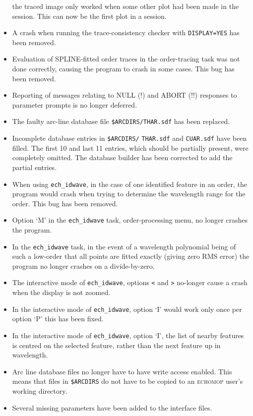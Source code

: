\documentclass[twoside,11pt,nolof]{starlink}
\begin{document}
\begin{itemize}
   the traced image only worked when some other plot had been made in
   the session.  This can now be the first plot in a session.
\item A crash when running the trace-consistency checker with
   {\tt DISPLAY=YES} has been removed.
\item Evaluation of SPLINE-fitted order traces in the order-tracing task
   was not done correctly, causing the program to crash in some cases.
   This bug has been removed.
\item Reporting of messages relating to NULL (!) and ABORT (!!) responses
   to parameter prompts is no longer deferred.
\item The faulty arc-line database file \texttt{\$ARCDIRS/THAR.sdf}
   has been replaced.
\item Incomplete database entries in \texttt{\$ARCDIRS/} \texttt{THAR.sdf} and
   \texttt{CUAR.sdf}
   have been filled.  The first 10 and last 11 entries, which should be
   partially present, were completely omitted.  The database builder has
   been corrected to add the partial entries.
\item When using {\tt ech\_idwave}, in the case of one identified feature in an
   order, the program would crash when trying to determine the wavelength
   range for the order.  This bug has been removed.
\item Option `M' in the {\tt ech\_idwave} task, order-processing menu,
   no longer crashes the program.
\item In the {\tt ech\_idwave} task, in the event of a wavelength polynomial
   being
   of such a low-order that all points are fitted exactly (giving zero
   RMS error) the program no longer crashes on a divide-by-zero.
\item The interactive mode of {\tt ech\_idwave}, options \texttt{<} and \texttt{>}
   no-longer cause a crash when the display is not zoomed.
\item In the interactive mode of {\tt ech\_idwave}, option `I' would work only
   once per option `P' this has been fixed.
\item In the interactive mode of {\tt ech\_idwave}, option `I', the list of
   nearby
   features is centred on the selected feature, rather than the next
   feature up in wavelength.
\item Arc line database files no longer have to have write access enabled.
   This means that files in \texttt{\$ARCDIRS} do not have to be copied to an
   \textsc{echomop} user's working directory.
\item Several missing parameters have been added to the interface files.

\end{itemize}
\end{document}
